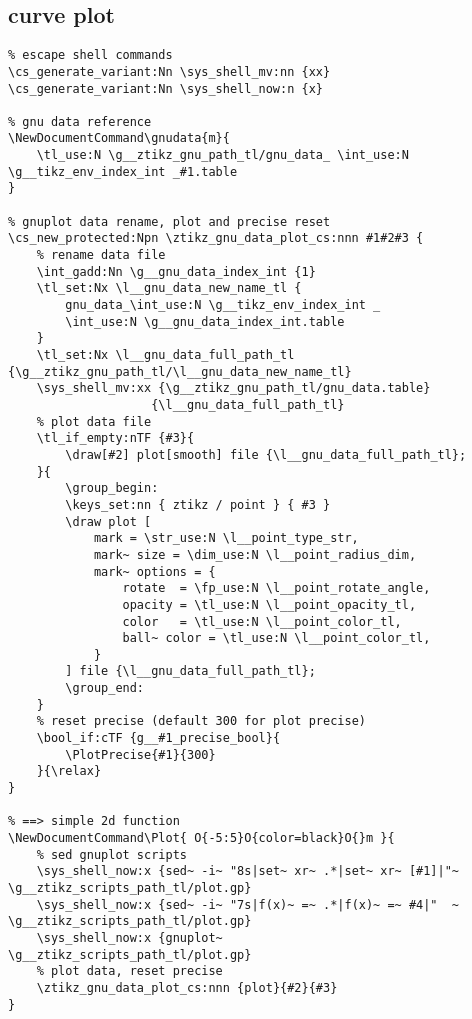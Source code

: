 \subsection{curve plot}
\begin{verbatim}
% escape shell commands 
\cs_generate_variant:Nn \sys_shell_mv:nn {xx}
\cs_generate_variant:Nn \sys_shell_now:n {x}

% gnu data reference
\NewDocumentCommand\gnudata{m}{
    \tl_use:N \g__ztikz_gnu_path_tl/gnu_data_ \int_use:N \g__tikz_env_index_int _#1.table
}

% gnuplot data rename, plot and precise reset
\cs_new_protected:Npn \ztikz_gnu_data_plot_cs:nnn #1#2#3 {
    % rename data file
    \int_gadd:Nn \g__gnu_data_index_int {1}
    \tl_set:Nx \l__gnu_data_new_name_tl {
        gnu_data_\int_use:N \g__tikz_env_index_int _
        \int_use:N \g__gnu_data_index_int.table
    }
    \tl_set:Nx \l__gnu_data_full_path_tl {\g__ztikz_gnu_path_tl/\l__gnu_data_new_name_tl}
    \sys_shell_mv:xx {\g__ztikz_gnu_path_tl/gnu_data.table}
                    {\l__gnu_data_full_path_tl}
    % plot data file
    \tl_if_empty:nTF {#3}{
        \draw[#2] plot[smooth] file {\l__gnu_data_full_path_tl};
    }{
        \group_begin:
        \keys_set:nn { ztikz / point } { #3 }
        \draw plot [
            mark = \str_use:N \l__point_type_str, 
            mark~ size = \dim_use:N \l__point_radius_dim,
            mark~ options = {
                rotate  = \fp_use:N \l__point_rotate_angle, 
                opacity = \tl_use:N \l__point_opacity_tl, 
                color   = \tl_use:N \l__point_color_tl,
                ball~ color = \tl_use:N \l__point_color_tl,
            }
        ] file {\l__gnu_data_full_path_tl};
        \group_end:
    }
    % reset precise (default 300 for plot precise)
    \bool_if:cTF {g__#1_precise_bool}{
        \PlotPrecise{#1}{300}
    }{\relax}
}

% ==> simple 2d function
\NewDocumentCommand\Plot{ O{-5:5}O{color=black}O{}m }{
    % sed gnuplot scripts
    \sys_shell_now:x {sed~ -i~ "8s|set~ xr~ .*|set~ xr~ [#1]|"~ \g__ztikz_scripts_path_tl/plot.gp}
    \sys_shell_now:x {sed~ -i~ "7s|f(x)~ =~ .*|f(x)~ =~ #4|"  ~ \g__ztikz_scripts_path_tl/plot.gp}
    \sys_shell_now:x {gnuplot~                                  \g__ztikz_scripts_path_tl/plot.gp}
    % plot data, reset precise
    \ztikz_gnu_data_plot_cs:nnn {plot}{#2}{#3}
}


\end{verbatim}
